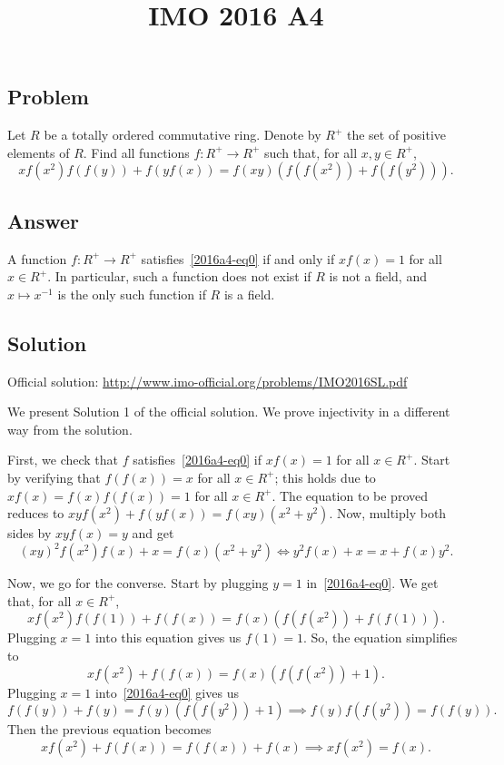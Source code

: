 \documentclass{article}
\title{IMO 2016 A4}
\author{}
\date{}
\begin{document}
\maketitle



\subsection*{Problem}

Let $R$ be a totally ordered commutative ring.
Denote by $R^+$ the set of positive elements of $R$.
Find all functions $f : R^+ \to R^+$ such that, for all $x, y \in R^+$,
\[ x f(x^2) f(f(y)) + f(y f(x)) = f(xy) (f(f(x^2)) + f(f(y^2))). \tag{*}\label{2016a4-eq0} \]



\subsection*{Answer}

A function $f : R^+ \to R^+$ satisfies~\eqref{2016a4-eq0} if and only if $x f(x) = 1$ for all $x \in R^+$.
In particular, such a function does not exist if $R$ is not a field, and $x \mapsto x^{-1}$ is the only such function if $R$ is a field.



\subsection*{Solution}

Official solution: \url{http://www.imo-official.org/problems/IMO2016SL.pdf}

We present Solution 1 of the official solution.
We prove injectivity in a different way from the solution.

First, we check that $f$ satisfies~\eqref{2016a4-eq0} if $x f(x) = 1$ for all $x \in R^+$.
Start by verifying that $f(f(x)) = x$ for all $x \in R^+$; this holds due to $x f(x) = f(x) f(f(x)) = 1$ for all $x \in R^+$.
The equation to be proved reduces to $xy f(x^2) + f(y f(x)) = f(xy) (x^2 + y^2)$.
Now, multiply both sides by $xy f(x) = y$ and get
\[ (xy)^2 f(x^2) f(x) + x = f(x) (x^2 + y^2) \iff y^2 f(x) + x = x + f(x) y^2. \]

Now, we go for the converse.
Start by plugging $y = 1$ in~\eqref{2016a4-eq0}.
We get that, for all $x \in R^+$,
\[ x f(x^2) f(f(1)) + f(f(x)) = f(x) (f(f(x^2)) + f(f(1))). \]
Plugging $x = 1$ into this equation gives us $f(1) = 1$.
So, the equation simplifies to
\[ x f(x^2) + f(f(x)) = f(x) (f(f(x^2)) + 1). \]
Plugging $x = 1$ into~\eqref{2016a4-eq0} gives us
\[ f(f(y)) + f(y) = f(y) (f(f(y^2)) + 1) \implies f(y) f(f(y^2)) = f(f(y)). \tag{1}\label{2016a4-eq1} \]
Then the previous equation becomes
\[ x f(x^2) + f(f(x)) = f(f(x)) + f(x) \implies x f(x^2) = f(x). \tag{2}\label{2016a4-eq2} \]
\end{document}

